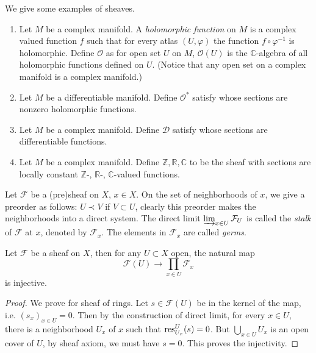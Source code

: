 \begin{eg}
    We give some examples of sheaves.
    \begin{enumerate}
        \item Let $M$ be a complex manifold.
        A \emph{holomorphic function} on $M$ is a complex valued function $f$ such that for every atlas $(U,\varphi)$ the function $f\circ\varphi^{-1}$ is holomorphic.
        Define $\mathcal{O}$ as for open set $U$ on $M$, $\mathcal{O}(U)$ is the $\mathbb{C}$-algebra of all holomorphic functions defined on $U$.
        (Notice that any open set on a complex manifold is a complex manifold.)
        \item Let $M$ be a differentiable manifold.
        Define $\mathcal{O}^*$ satisfy whose sections are nonzero holomorphic functions.
        \item Let $M$ be a complex manifold.
        Define $\mathcal{D}$ satisfy whose sections are differentiable functions.
        \item Let $M$ be a complex manifold.
        Define $\mathbb{Z},\mathbb{R},\mathbb{C}$ to be the sheaf with sections are locally constant $\mathbb{Z}$-, $\mathbb{R}$-, $\mathbb{C}$-valued functions.
    \end{enumerate}
\end{eg}

\begin{defn}
    Let $\mathcal{F}$ be a (pre)sheaf on $X$, $x\in X$.
    On the set of neighborhoods of $x$, we give a preorder as follows: $U\prec V$ if $V\subset U$, clearly this preorder makes the neighborhoods into a direct system.
    The direct limit $\varinjlim_{x\in U}\mathcal{F}_U$ is called the \emph{stalk} of $\mathcal{F}$ at $x$, denoted by $\mathcal{F}_x$.
    The elements in $\mathcal{F}_x$ are called \emph{germs}.
\end{defn}

\begin{prop}\label{inj of natural map}
    Let $\mathcal{F}$ be a sheaf on $X$, then for any $U\subset X$ open, the natural map
    \[
        \mathcal{F}(U)\to\prod_{x\in U}\mathcal{F}_x
    \]
    is injective.
\end{prop}
\begin{proof}
    We prove for sheaf of rings.
    Let $s\in\mathcal{F}(U)$ be in the kernel of the map, i.e. $(s_x)_{x\in U}=0$.
    Then by the construction of direct limit, for every $x\in U$, there is a neighborhood $U_x$ of $x$ such that $\operatorname{res}^U_{U_x}(s)=0$.
    But $\bigcup_{x\in U}U_x$ is an open cover of $U$, by sheaf axiom, we must have $s=0$.
    This proves the injectivity.
\end{proof}

